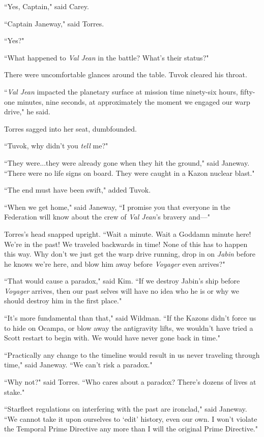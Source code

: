 \documentclass[twoside,letterpaper,12pt]{memoir}
\begin{document}
``Yes, Captain," said Carey. 

``Captain Janeway," said Torres. 

``Yes?" 

``What happened to \textit{Val Jean} in the battle? What's their status?" 

There were uncomfortable glances around the table. Tuvok cleared his throat. 

``\textit{Val Jean} impacted the planetary surface at mission time ninety-six hours, fifty-one minutes, nine seconds, at approximately the moment we engaged our warp drive," he said. 

Torres sagged into her seat, dumbfounded. 

``Tuvok, why didn't you \textit{tell} me?" 

``They were...they were already gone when they hit the ground," said Janeway. ``There were no life signs on board. They were caught in a Kazon nuclear blast." 

``The end must have been swift," added Tuvok. 

``When we get home," said Janeway, ``I promise you that everyone in the Federation will know about the crew of \textit{Val Jean}'s bravery and---" 

Torres's head snapped upright. ``Wait a minute. Wait a Goddamn minute here! We're in the past! We traveled backwards in time! None of this has to happen this way. Why don't we just get the warp drive running, drop in on \textit{Jabin} before he knows we're here, and blow him away before \textit{Voyager} even arrives?" 

``That would cause a paradox," said Kim. ``If we destroy Jabin's ship before \textit{Voyager} arrives, then our past selves will have no idea who he is or why we should destroy him in the first place." 

``It's more fundamental than that," said Wildman. ``If the Kazons didn't force us to hide on Ocampa, or blow away the antigravity lifts, we wouldn't have tried a Scott restart to begin with. We would have never gone back in time." 

``Practically any change to the timeline would result in us never traveling through time," said Janeway. ``We can't risk a paradox." 

``Why not?" said Torres. ``Who cares about a paradox? There's dozens of lives at stake." 

``Starfleet regulations on interfering with the past are ironclad," said Janeway. ``We cannot take it upon ourselves to `edit' history, even our own. I won't violate the Temporal Prime Directive any more than I will the original Prime Directive." 
\end{document}

